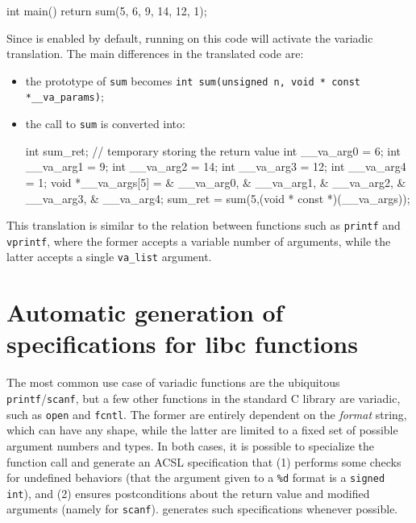 \begin{ccode}
int main(){
  return sum(5, 6, 9, 14, 12, 1);
}
\end{ccode}

Since  is enabled by default, running
\FramaC on this code will activate the variadic translation.
The main differences in the translated code are:

\begin{itemize}
\item the prototype of \verb+sum+ becomes
  \verb+int sum(unsigned n, void * const *__va_params)+;
\item the call to \verb+sum+ is converted into:
  \begin{ccode}
  int sum_ret; // temporary storing the return value
  {
    int __va_arg0 = 6;
    int __va_arg1 = 9;
    int __va_arg2 = 14;
    int __va_arg3 = 12;
    int __va_arg4 = 1;
    void *__va_args[5] = {& __va_arg0, & __va_arg1,
                            & __va_arg2, & __va_arg3, & __va_arg4};
    sum_ret = sum(5,(void * const *)(__va_args));
  }
  \end{ccode}
\end{itemize}

This translation is similar to the relation between functions such as
\verb+printf+ and \verb+vprintf+, where the former accepts a variable number of
arguments, while the latter accepts a single \verb+va_list+ argument.

\section{Automatic generation of specifications for libc functions}

The most common use case of variadic functions are the ubiquitous
\verb+printf+/\verb+scanf+, but a few other functions in the standard
C library are variadic, such as \verb+open+ and \verb+fcntl+.
The former are entirely dependent on the {\em format} string, which can have
any shape, while the latter are limited to a fixed set of possible argument
numbers and types. In both cases, it is possible to specialize the function
call and generate an ACSL specification that (1) performs some checks for
undefined behaviors (\eg that the argument given to a \verb+%d+ format is a
\verb+signed int+), and (2) ensures postconditions about the return value
and modified arguments (namely for \verb+scanf+).
 generates such specifications whenever possible.

